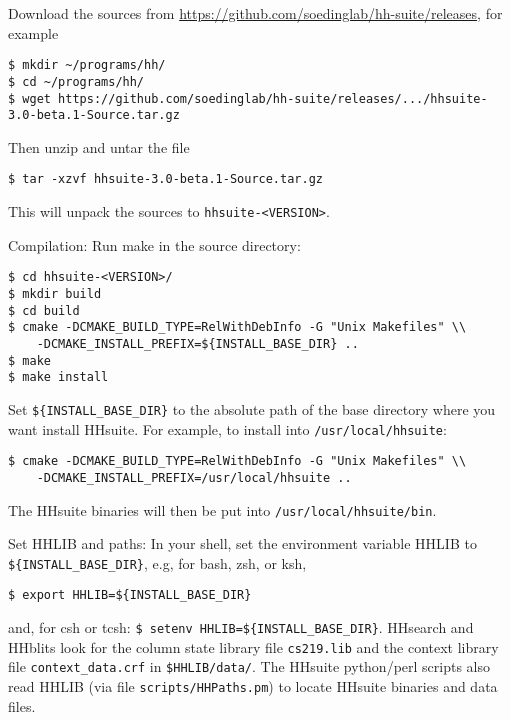 \documentclass[11pt,a4paper]{article}
\begin{document}
\begin{enum}

\item Download the sources from \url{https://github.com/soedinglab/hh-suite/releases}, for example
\begin{verbatim}
$ mkdir ~/programs/hh/
$ cd ~/programs/hh/
$ wget https://github.com/soedinglab/hh-suite/releases/.../hhsuite-3.0-beta.1-Source.tar.gz 
\end{verbatim}
\vspace{2mm}


\item Then unzip and untar the file
\begin{verbatim}
$ tar -xzvf hhsuite-3.0-beta.1-Source.tar.gz
\end{verbatim}
This will unpack the sources to \verb`hhsuite-<VERSION>`.
\vspace{2mm}


\item Compilation: Run make in the source directory:
\begin{verbatim}
$ cd hhsuite-<VERSION>/
$ mkdir build
$ cd build
$ cmake -DCMAKE_BUILD_TYPE=RelWithDebInfo -G "Unix Makefiles" \\
    -DCMAKE_INSTALL_PREFIX=${INSTALL_BASE_DIR} ..
$ make
$ make install
\end{verbatim}

Set \verb`${INSTALL_BASE_DIR}` to the absolute path of the base directory where you want install HHsuite.
For example, to install into \verb`/usr/local/hhsuite`:
\begin{verbatim}
$ cmake -DCMAKE_BUILD_TYPE=RelWithDebInfo -G "Unix Makefiles" \\
    -DCMAKE_INSTALL_PREFIX=/usr/local/hhsuite ..
\end{verbatim}

The HHsuite binaries will then be put into \verb`/usr/local/hhsuite/bin`.

\vspace{2mm}

\item Set HHLIB and paths: In your shell, set the environment variable HHLIB to \verb`${INSTALL_BASE_DIR}`, 
e.g, for bash, zsh, or ksh,
\begin{verbatim}
$ export HHLIB=${INSTALL_BASE_DIR}
\end{verbatim}
and, for csh or tcsh: \verb`$ setenv HHLIB=${INSTALL_BASE_DIR}`. 
HHsearch and HHblits look for the column state library file \verb`cs219.lib`
and the context library file \verb`context_data.crf` in \verb`$HHLIB/data/`. The HHsuite
python/perl scripts also read HHLIB (via file \verb`scripts/HHPaths.pm`) to locate HHsuite binaries and data files.


\end{enum}
\end{document}

